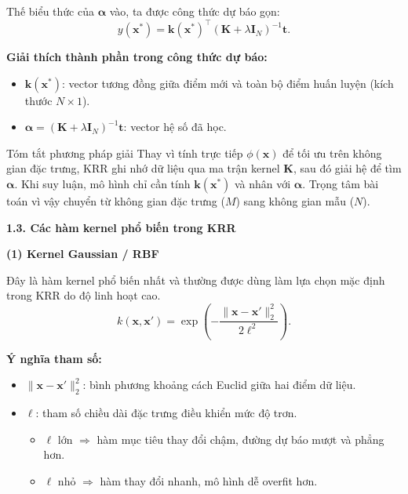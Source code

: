 Thế biểu thức của $\boldsymbol{\alpha}$ vào, ta được công thức dự báo gọn:
\begin{equation}
    y(\mathbf{x}^*)=\mathbf{k}(\mathbf{x}^*)^\top(\mathbf{K}+\lambda\mathbf{I}_N)^{-1}\mathbf{t}.
\end{equation}

\textbf{Giải thích thành phần trong công thức dự báo:}
\begin{itemize} [labelsep=10pt, leftmargin=2cm]
    \item $\mathbf{k}(\mathbf{x}^*)$: vector tương đồng giữa điểm mới và toàn bộ điểm huấn luyện (kích thước $N\times 1$).
    \item $\boldsymbol{\alpha}=(\mathbf{K}+\lambda\mathbf{I}_N)^{-1}\mathbf{t}$: vector hệ số đã học.
\end{itemize}

\begin{importantbox}{Tóm tắt phương pháp giải}
Thay vì tính trực tiếp $\phi(\mathbf{x})$ để tối ưu trên không gian đặc trưng, KRR ghi nhớ dữ liệu qua ma trận kernel $\mathbf{K}$, sau đó giải hệ để tìm $\boldsymbol{\alpha}$. Khi suy luận, mô hình chỉ cần tính $\mathbf{k}(\mathbf{x}^*)$ và nhân với $\boldsymbol{\alpha}$. Trọng tâm bài toán vì vậy chuyển từ không gian đặc trưng ($M$) sang không gian mẫu ($N$).
\end{importantbox}
\vspace{0.5em}
\textbf{1.3. Các hàm kernel phổ biến trong KRR}

\textbf{(1) Kernel Gaussian / RBF}

Đây là hàm kernel phổ biến nhất và thường được dùng làm lựa chọn mặc định trong KRR do độ linh hoạt cao.
\begin{equation}
    k(\mathbf{x},\mathbf{x}')=\exp\!\left(-\frac{\|\mathbf{x}-\mathbf{x}'\|_2^2}{2\ell^2}\right).
\end{equation}

\textbf{Ý nghĩa tham số:}
\begin{itemize} [labelsep=10pt, leftmargin=2cm]
    \item $\|\mathbf{x}-\mathbf{x}'\|_2^2$: bình phương khoảng cách Euclid giữa hai điểm dữ liệu.
    \item $\ell$: tham số chiều dài đặc trưng điều khiển mức độ trơn.
    \begin{itemize}
        \item $\ell$ lớn $\Rightarrow$ hàm mục tiêu thay đổi chậm, đường dự báo mượt và phẳng hơn.
        \item $\ell$ nhỏ $\Rightarrow$ hàm thay đổi nhanh, mô hình dễ overfit hơn.
    \end{itemize}
\end{itemize}


